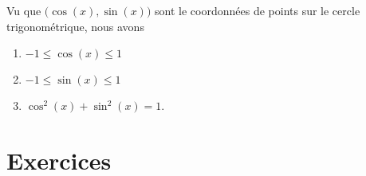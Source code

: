 \begin{propriete}
    Vu que \( \big( \cos(x),\sin(x) \big)\) sont le coordonnées de points sur le cercle trigonométrique, nous avons
    \begin{enumerate}
        \item
            \( -1\leq \cos(x)\leq 1\)
        \item
            \( -1\leq \sin(x)\leq 1\)
        \item
            \( \cos^2(x)+\sin^2(x)=1\).
    \end{enumerate}
\end{propriete}

\section{Exercices}


